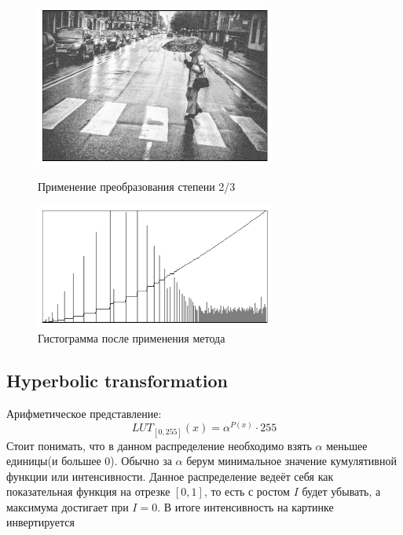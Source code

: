\documentclass[a4paper,12pt]{article}
\begin{document}
\begin{figure}[H]
    \centering \includegraphics[width=0.7\textwidth]{images/23.png}
    \caption{Применение преобразования степени 2/3}
    \centering \includegraphics[width=0.7\textwidth]{images/23_hist.png}
    \caption{Гистограмма после применения метода}
\end{figure}

\subsection{Hyperbolic transformation}
Арифметическое представление:
$$LUT_{[0,255]}(x) = \alpha^{P(x)} \cdot 255$$
Стоит понимать, что в данном распределение необходимо взять $\alpha$ меньшее единицы(и большее 0). Обычно за $\alpha$ берум минимальное значение кумулятивной функции или интенсивности. Данное распределение ведеёт себя как показательная функция на отрезке $[0,1]$, то есть с ростом $I$ будет убывать, а максимума достигает при $I=0$. В итоге интенсивность на картинке инвертируется 
\end{document}
